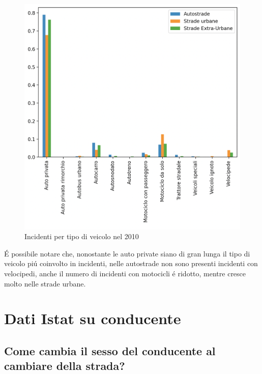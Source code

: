 \documentclass[a4paper]{report}
\begin{document}
\begin{figure}[!ht]
    \includegraphics[width=\linewidth]{../src/incidenti/incidenti_senza_coords/tipo_veicoli/differenza_strade.png}
    \caption{Incidenti per tipo di veicolo nel 2010}
    \label{fig:differenza_strade}
\end{figure}

\'E possibile notare che, nonostante le auto private siano di gran lunga il tipo di veicolo 
pi\'u coinvolto in incidenti, nelle autostrade non sono presenti incidenti con velocipedi, 
anche il numero di incidenti con motocicli \'e ridotto, mentre cresce molto nelle strade urbane.


\newpage
\section{Dati Istat su conducente}

\newpage
\subsection{Come cambia il sesso del conducente al cambiare della strada?}
\end{document}
